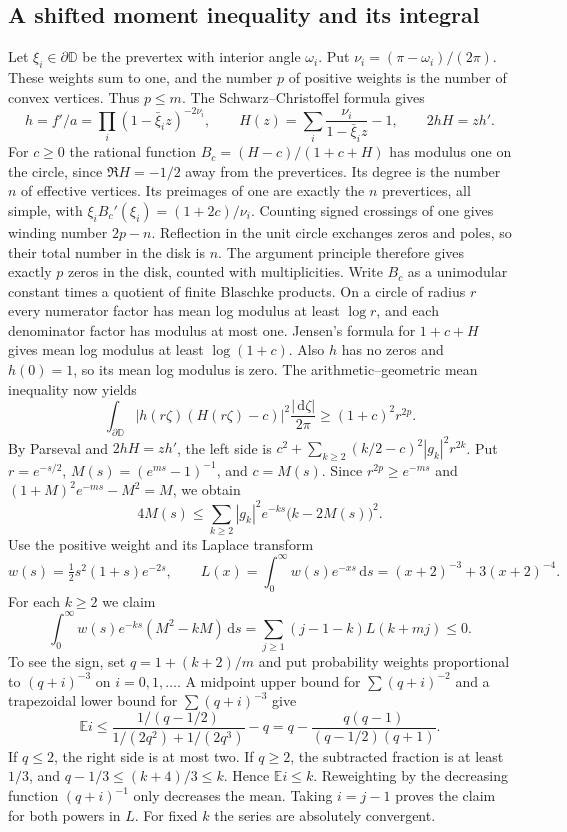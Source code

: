 \documentclass[11pt,a4paper,reqno]{amsart}
\theoremstyle{remark}
\numberwithin{equation}{section}
\newcommand{\dd}{\,\mathrm d}
\newcommand{\D}{\mathbb D}
\begin{document}
\subsection{A shifted moment inequality and its integral}
Let $\xi_i\in\partial\D$ be the prevertex with interior angle $\omega_i$.
Put $\nu_i=(\pi-\omega_i)/(2\pi)$. These weights sum to one, and the
number $p$ of positive weights is the number of convex vertices. Thus
$p\le m$. The Schwarz--Christoffel formula gives
\[
 h=f'/a=\prod_i(1-\bar\xi_i z)^{-2\nu_i},\qquad
 H(z)=\sum_i\frac{\nu_i}{1-\bar\xi_i z}-1,\qquad 2hH=zh'.
\]
For $c\ge0$ the rational function $B_c=(H-c)/(1+c+H)$ has modulus one on
the circle, since $\Re H=-1/2$ away from the prevertices. Its degree is
the number $n$ of effective vertices. Its preimages of one are exactly the
$n$ prevertices, all simple, with $\xi_iB_c'(\xi_i)=(1+2c)/\nu_i$.
Counting signed crossings of one gives winding number $2p-n$.
Reflection in the unit circle exchanges zeros and poles, so their total
number in the disk is $n$. The argument principle therefore gives exactly
$p$ zeros in the disk, counted with multiplicities. Write $B_c$ as a
unimodular constant times a quotient of finite Blaschke products.
On a circle of radius $r$ every numerator factor has mean log modulus at
least $\log r$, and each denominator factor has modulus at most one.
Jensen's formula for $1+c+H$ gives mean log modulus at least $\log(1+c)$.
Also $h$ has no zeros and $h(0)=1$, so its mean log modulus is zero.
The arithmetic--geometric mean inequality now yields
\[
 \int_{\partial\D}|h(r\zeta)(H(r\zeta)-c)|^2\frac{|\dd\zeta|}{2\pi}
       \ge (1+c)^2 r^{2p}.
\]
By Parseval and $2hH=zh'$, the left side is
$c^2+\sum_{k\ge2}(k/2-c)^2|g_k|^2r^{2k}$. Put $r=e^{-s/2}$,
$M(s)=(e^{ms}-1)^{-1}$, and $c=M(s)$. Since $r^{2p}\ge e^{-ms}$ and
$(1+M)^2e^{-ms}-M^2=M$, we obtain
\begin{equation}\label{eq:jensen}
 4 M(s)\le \sum_{k\ge2}|g_k|^2e^{-ks}\big(k-2M(s)\big)^2 .
\end{equation}
Use the positive weight and its Laplace transform
\[
 w(s)=\tfrac12s^2(1+s)e^{-2s},\qquad
 L(x)=\int_0^\infty w(s)e^{-xs}\dd s=(x+2)^{-3}+3(x+2)^{-4}.
\]
For each $k\ge2$ we claim
\begin{equation}\label{eq:nonpositive}
 \int_0^\infty w(s)e^{-ks}(M^2-kM)\dd s
       =\sum_{j\ge1}(j-1-k)L(k+mj)\le0.
\end{equation}
To see the sign, set $q=1+(k+2)/m$ and put probability weights proportional
to $(q+i)^{-3}$ on $i=0,1,\ldots$. A midpoint upper bound for
$\sum(q+i)^{-2}$ and a trapezoidal lower bound for $\sum(q+i)^{-3}$ give
\[
 \mathbb E i\le
 \frac{1/(q-1/2)}{1/(2q^2)+1/(2q^3)}-q
 =q-\frac{q(q-1)}{(q-1/2)(q+1)} .
\]
If $q\le2$, the right side is at most two. If $q\ge2$, the subtracted
fraction is at least $1/3$, and $q-1/3\le(k+4)/3\le k$. Hence
$\mathbb E i\le k$. Reweighting by the decreasing function $(q+i)^{-1}$
only decreases the mean. Taking $i=j-1$ proves the claim for both powers
in $L$. For fixed $k$ the series are absolutely convergent.
\end{document}

